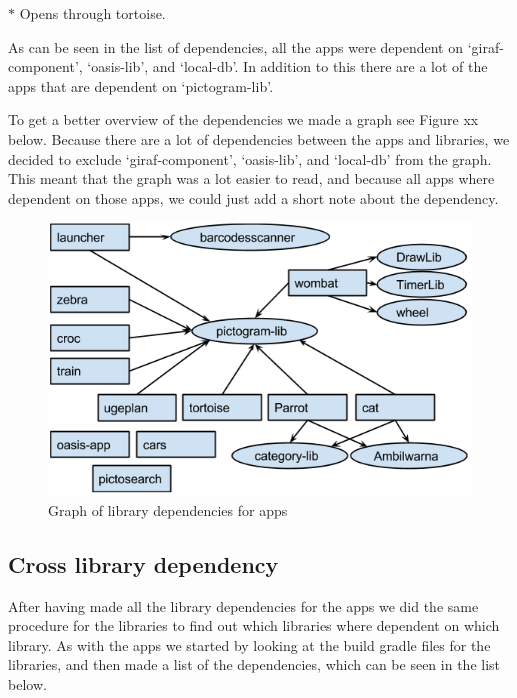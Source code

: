 $*$ Opens through tortoise.

As can be seen in the list of dependencies, all the apps were dependent on ‘giraf-component’, ‘oasis-lib’, and ‘local-db’. In addition to this there are a lot of the apps that are dependent on ‘pictogram-lib’.

To get a better overview of the dependencies we made a graph see Figure xx below. Because there are a lot of dependencies between the apps and libraries, we decided to exclude ‘giraf-component’, ‘oasis-lib’, and ‘local-db’ from the graph. This meant that the graph was a lot easier to read, and because all apps where dependent on those apps, we could just add a short note about the dependency.


\begin{figure}[H]
	\centering
	\includegraphics[width=0.8 \textwidth]{pictures/AppLibependencies.png}
	\caption{Graph of library dependencies for apps}
	\label{AppLibependencies}
\end{figure}

\subsection{Cross library dependency}
After having made all the library dependencies for the apps we did the same procedure for the libraries to find out which libraries where dependent on which library. As with the apps we started by looking at the build gradle files for the libraries, and then made a list of the dependencies, which can be seen in the list below.

